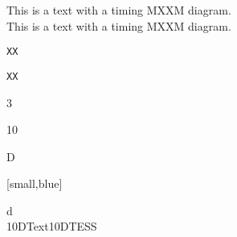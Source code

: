 \documentclass{article}
\newcounter{hexcount}
\newcommand{\hexcount}{%
  \pgfmathdectoBase\thehexcount{\value{hexcount}}{16}%
  \thehexcount
  \addtocounter{hexcount}{+1}%
}
\begin{document}
\noindent
This is a text with a timing MXXM diagram.\\
This is a text with a timing MXXM diagram.


\def\gobble#1{}

\texttt\bgroup XX\egroup

\DeclareRobustCommand\testtt[1]{\texttt{#1}}
\testtt\bgroup XX\egroup

\noindent
\begin{tikztimingexampletable}
  [d]3{10{D{[small,blue]\hexcount}}}d \\
 10D{Text}10D{TESS} \\
\end{tikztimingexampletable}
\end{document}
